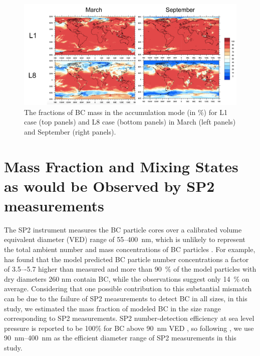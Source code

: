 \documentclass[12pt, fullpage]{uiucthesis2009}
\begin{document}
	\begin{figure}[h] 
		\begin{center}
			\includegraphics[width = 1\textwidth]{Figure19}
			\caption[The fractions of BC mass in the accumulation mode (in $\%$) for L1 case (top panels) and L8 case (bottom panels) in March (left panels) and September (right panels)]{\label{fig_P19}The fractions of BC mass in the accumulation mode (in $\%$) for L1 case (top panels) and L8 case (bottom panels) in March (left panels) and September (right panels).}
		\end{center}
	\end{figure}
	
	\section{Mass Fraction and Mixing States as would be Observed by SP2 measurements}
	The SP2 instrument measures the BC particle cores over a calibrated volume equivalent diameter (VED) range of 55--400~nm, which is unlikely to represent the total
	ambient number and mass concentrations of BC particles \citep{Reddington2013}. For example, \citet{Reddington2013} has found that the model predicted BC particle number concentrations a factor of 3.5–-5.7 higher than measured and more than 90~$\%$ of the model particles with dry diameters 260 nm contain BC, while the observations suggest only 14~$\%$ on average. Considering that one possible contribution to this substantial mismatch can be due to the failure of SP2 measurements to detect BC in all sizes, in this study, we estimated the mass fraction of modeled BC in the size range corresponding to SP2 measurements. SP2 number-detection efficiency at sea level pressure is reported to be 100$\%$ for BC above 90~nm VED \citep{schwarz2010global}, so following \citet{Reddington2013}, we use 90~nm--400~nm as the efficient diameter range of SP2 measurements in this study.
	
\end{document}
